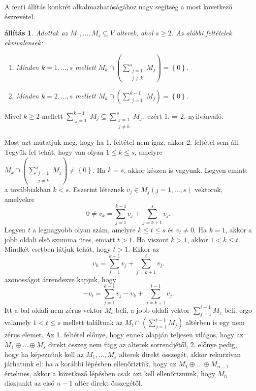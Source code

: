 \documentclass[9pt, a4paper, showtrims]{memoir}
\makeatletter
\renewenvironment{proof}[1][\proofname]
    {\par\pushQED{\qed}%
    \normalfont \topsep6\p@\@plus6\p@\relax
    \trivlist
    \item[\hskip\labelsep
        \itshape
    #1\@addpunct{:}]\ignorespaces}
    {\popQED\endtrivlist\@endpefalse}
\theoremstyle{plain}
\newtheorem{proposition}{állítás}[chapter]
\theoremstyle{remark}
\theoremstyle{definition}
\makeatother
\begin{document}
A fenti állítás konkrét alkalmazhatóságához nagy segítség a most következő észrevétel.
\begin{proposition}\label{pr:dirosszegelozo}
    Adottak az $M_1,\dots,M_s\subseteq V$ alterek, ahol $s\geq 2$.
    Az alábbi feltételek ekvivalensek:
    \begin{enumerate}
        \item Minden $k=1,\dots,s$ mellett
            $M_k\cap\left( \sum_{\substack{j=1\\j\neq k}}^sM_j \right)=\left\{ 0 \right\}$.
        \item Minden $k=2,\dots,s$ mellett
            $M_k\cap\left( \sum_{\substack{j=1}}^{k-1}M_j \right)=\left\{ 0 \right\}$.
    \end{enumerate}
\end{proposition}
\begin{proof}
    Mivel $k\geq 2$ mellett
    $
    \sum_{\substack{j=1}}^{k-1}M_j
    \subseteq
    \sum_{\substack{j=1\\j\neq k}}^sM_j,
    $
    ezért $1.\Rightarrow 2.$ nyilvánvaló.

    Most azt mutatjuk meg, hogy ha 1. feltétel nem igaz, akkor 2. feltétel sem áll.
    Tegyük fel tehát, 
    hogy van olyan $1\leq k\leq s$,
    amelyre 
    $M_k\cap\left( \sum_{\substack{j=1\\j\neq k}}^sM_j \right)\neq\left\{ 0 \right\}$.
    Ha $k=s$, akkor készen is vagyunk.
    Legyen emiatt a továbbiakban $k<s$.
    Eszerint léteznek $v_j\in M_j (j=1,\dots,s)$ vektorok, amelyekre
    \[
        0\neq v_k=
        \sum_{j=1}^{k-1}v_j
        +
        \sum_{j=k+1}^{s}v_j.
    \]
    Legyen $t$ a legnagyobb olyan szám, amelyre $k\leq t\leq s$ és $v_t\neq 0$.
    Ha $k=1$, akkor a jobb oldali első szumma üres, emiatt $t>1$.
    Ha viszont $k>1$, akkor $1<k\leq t$.
    Mindkét esetben látjuk tehát, hogy $t>1$.
    Ekkor az
    \[
        v_k=
        \sum_{j=1}^{k-1}v_j
        +
        \sum_{j=k+1}^{t}v_j.
    \]
    azonosságot átrendezve kapjuk, hogy 
    \[
        -v_t
        =
        \sum_{j=1}^{k-1}v_j
        -
        v_k
        +
        \sum_{j=k+1}^{t-1}v_j.
    \]
    Itt a bal oldali nem zérus vektor $M_t$-beli, 
    a jobb oldali vektor $\sum_{j=1}^{t-1}M_j$-beli, 
    ergo valamely $1<t\leq s$ mellett találtunk az $M_t\cap\left( \sum_{j=1}^{t-1}M_j \right)$
    altérben is egy nem zérus elemet.
\end{proof}
Az 1. feltétel előnye, hogy ennek alapján teljesen világos, hogy az 
$M_1\oplus\dots\oplus M_s$ direkt összeg nem függ az alterek sorrendjétől,
2. előnye pedig,
hogy ha képeznünk kell az $M_1,\dots,M_s$ alterek direkt összegét, 
akkor rekurzívan járhatunk el: 
ha a korábbi lépésben ellenőriztük, hogy az $M_1\oplus\dots\oplus M_{n-1}$ értelmes, akkor 
a következő lépésben csak azt kell ellenőriznünk, 
hogy $M_n$ diszjunkt az első $n-1$ altér direkt összegétől.
\end{document}
